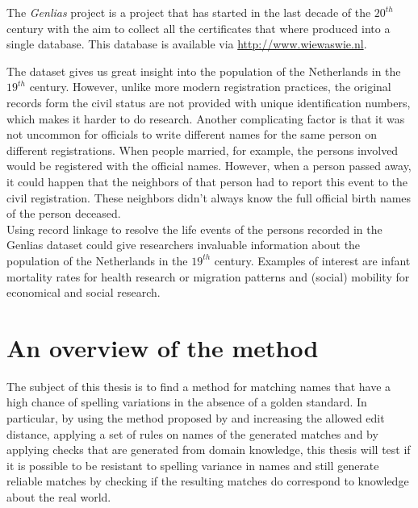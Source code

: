 The \textit{Genlias} project is a project that has started in the last decade of the $20^{th}$ century with the aim to collect all the certificates that where produced into a single database. This database is available via \url{http://www.wiewaswie.nl}. \newline

The dataset gives us great insight into the population of the Netherlands in the $19^{th}$ century. However, unlike more modern registration practices, the original records form the civil status are not provided with unique identification numbers, which makes it harder to do research. Another complicating factor is that it was not uncommon for officials to write different names for the same person on different registrations. When people married, for example, the persons involved would be registered with the official names. However, when a person passed away, it could happen that the neighbors of that person had to report this event to the civil registration. These neighbors didn't always know the full official birth names of the person deceased.\\ 

Using record linkage to resolve the life events of the persons recorded in the Genlias dataset could give researchers invaluable information about the population of the Netherlands in the $19^{th}$ century. Examples of interest are infant mortality rates for health research or migration patterns and (social) mobility for economical and social research.

\section{An overview of the method}
The subject of this thesis is to find a method for matching names that have a high chance of spelling variations in the absence of a golden standard. In particular, by using the method proposed by \cite{Aspects001} and increasing the allowed edit distance, applying a set of rules on names of the generated matches and by applying checks that are generated from domain knowledge, this thesis will test if it is possible to be resistant to spelling variance in names and still generate reliable matches by checking if the resulting matches do correspond to knowledge about the real world. \\

